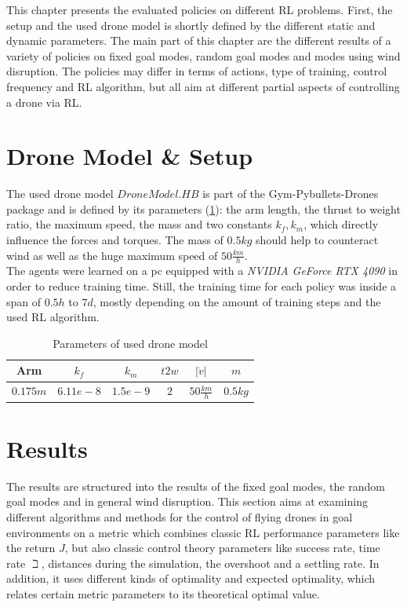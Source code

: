 This chapter presents the evaluated policies on different RL problems. 
First, the setup and the used drone model is shortly defined by the different static and dynamic parameters. 
The main part of this chapter are the different results of a variety of policies on fixed goal modes, random goal modes and modes using wind disruption. 
The policies may differ in terms of actions, type of training, control frequency and RL algorithm, but all aim at different partial aspects of controlling a drone via RL.

\section{Drone Model \& Setup}
The used drone model $DroneModel.HB$ is part of the Gym-Pybullets-Drones package and is defined by its parameters (\cref{tab:drone}): 
the arm length, the thrust to weight ratio, the maximum speed, the mass and two constants $k_f, k_m$, which directly influence the forces and torques.
The mass of $0.5kg$ should help to counteract wind as well as the huge maximum speed of $50 \frac{km}{h}$.\\
The agents were learned on a pc equipped with a \emph{NVIDIA GeForce RTX 4090} in order to reduce training time. 
Still, the training time for each policy was inside a span of $0.5h$ to $7d$, 
mostly depending on the amount of training steps and the used RL algorithm.

\begin{table}
	\centering
	\caption{Parameters of used drone model}\label{tab:drone}
	\begin{tabular}{|c|c|c|c|c|c|}
		\hline
		Arm & $k_f$& $k_m$ & $t2w$ & $|\dot{v}|$ & $m$ \\
		\hline
		$0.175m$ & $6.11e-8$ & $1.5e-9$ & $2$ & $50 \frac{km}{h}$ & $0.5 kg$\\
		\hline
	\end{tabular}
\end{table}


\section{Results}
The results are structured into the results of the fixed goal modes, the random goal modes and in general wind disruption. 
This section aims at examining different algorithms and methods for the control of flying drones in goal environments 
on a metric which combines classic RL performance parameters like the return $J$, but also classic control theory parameters like 
success rate, time rate $\beth$, distances during the simulation, the overshoot and a settling rate. 
In addition, it uses different kinds of optimality and expected optimality, 
which relates certain metric parameters to its theoretical optimal value.

